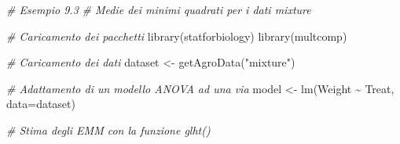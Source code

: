 \documentclass[
  12pt,
]{book}
\newenvironment{Shaded}{\begin{snugshade}}{\end{snugshade}}
\newcommand{\AttributeTok}[1]{\textcolor[rgb]{0.77,0.63,0.00}{#1}}
\newcommand{\CommentTok}[1]{\textcolor[rgb]{0.56,0.35,0.01}{\textit{#1}}}
\newcommand{\FunctionTok}[1]{\textcolor[rgb]{0.00,0.00,0.00}{#1}}
\newcommand{\NormalTok}[1]{#1}
\newcommand{\OtherTok}[1]{\textcolor[rgb]{0.56,0.35,0.01}{#1}}
\newcommand{\SpecialCharTok}[1]{\textcolor[rgb]{0.00,0.00,0.00}{#1}}
\newcommand{\StringTok}[1]{\textcolor[rgb]{0.31,0.60,0.02}{#1}}
\begin{document}
\begin{Shaded}
\begin{Highlighting}[]
\CommentTok{\# Esempio 9.3}
\CommentTok{\# Medie dei minimi quadrati per i dati \textquotesingle{}mixture\textquotesingle{}}

\CommentTok{\# Caricamento dei pacchetti}
\FunctionTok{library}\NormalTok{(statforbiology)}
\FunctionTok{library}\NormalTok{(multcomp)}

\CommentTok{\# Caricamento dei dati}
\NormalTok{dataset }\OtherTok{\textless{}{-}} \FunctionTok{getAgroData}\NormalTok{(}\StringTok{"mixture"}\NormalTok{)}

\CommentTok{\# Adattamento di un modello ANOVA ad una via}
\NormalTok{model }\OtherTok{\textless{}{-}} \FunctionTok{lm}\NormalTok{(Weight }\SpecialCharTok{\textasciitilde{}}\NormalTok{ Treat, }\AttributeTok{data=}\NormalTok{dataset)}

\CommentTok{\# Stima degli EMM con la funzione \textquotesingle{}glht()\textquotesingle{}}


\end{Highlighting}
\end{Shaded}
\end{document}
